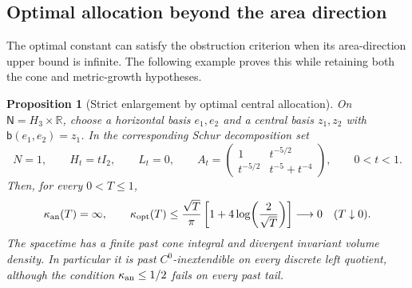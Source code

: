 \documentclass[10pt,a4paper]{article}
\numberwithin{equation}{section}
\newtheorem{proposition}[theorem]{Proposition}
\theoremstyle{definition}
\theoremstyle{remark}
\begin{document}
\subsection{Optimal allocation beyond the area direction}

The optimal constant can satisfy the obstruction criterion when its
area-direction upper bound is infinite.  The following example proves
this while retaining both the cone and metric-growth hypotheses.

\begin{proposition}[Strict enlargement by optimal central allocation]
\label{prop:strict-optimal-allocation}
On $\mathsf N=H_3\times\mathbb R$, choose a horizontal basis
$e_1,e_2$ and a central basis $z_1,z_2$ with
$\mathsf b(e_1,e_2)=z_1$.  In the corresponding Schur decomposition set
\begin{equation}
 N=1,\qquad H_t=tI_2,\qquad L_t=0,\qquad
 A_t=\begin{pmatrix}
 1&t^{-5/2}\\ t^{-5/2}&t^{-5}+t^{-4}
 \end{pmatrix},\qquad 0<t<1.
 \label{eq:strict-optimal-metric}
\end{equation}
Then, for every $0<T\le1$,
\begin{equation}
 \kappa_{\rm an}(T)=\infty,\qquad
 \kappa_{\rm opt}(T)
 \le\frac{\sqrt T}{\pi}
       \left[1+4\log\!\left(\frac2{\sqrt T}\right)\right]
 \longrightarrow0\quad(T\downarrow0).
 \label{eq:strict-optimal-bound}
\end{equation}
The spacetime has a finite past cone integral and divergent invariant
volume density.  In particular it is past $C^0$-inextendible on every
discrete left quotient, although the condition
$\kappa_{\rm an}\le1/2$ fails on every past tail.
\end{proposition}
\end{document}
